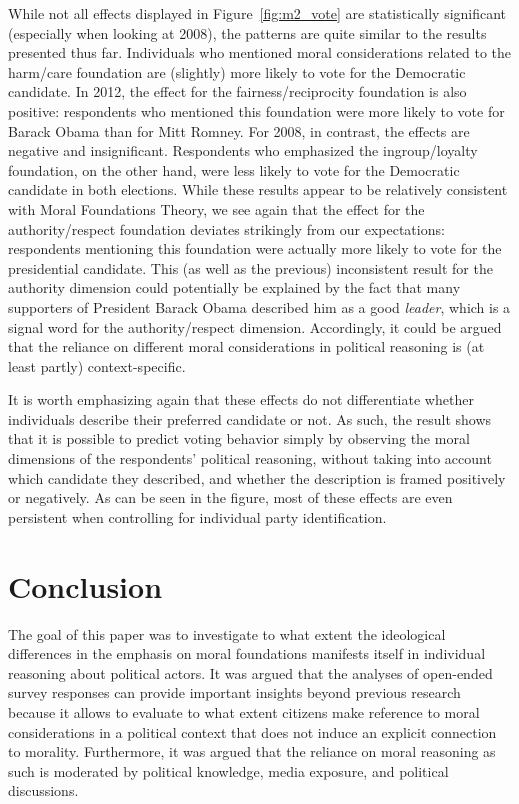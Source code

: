 \documentclass[12pt]{paper}
\begin{document}
While not all effects displayed in Figure~\ref{fig:m2_vote} are statistically significant (especially when looking at 2008), the patterns are quite similar to the results presented thus far. Individuals who mentioned moral considerations related to the harm/care foundation are (slightly) more likely to vote for the Democratic candidate. In 2012, the effect for the fairness/reciprocity foundation is also positive: respondents who mentioned this foundation were more likely to vote for Barack Obama than for Mitt Romney. For 2008, in contrast, the effects are negative and insignificant. Respondents who emphasized the ingroup/loyalty foundation, on the other hand, were less likely to vote for the Democratic candidate in both elections. While these results appear to be relatively consistent with Moral Foundations Theory, we see again that the effect for the authority/respect foundation deviates strikingly from our expectations: respondents mentioning this foundation were actually more likely to vote for the presidential candidate. This (as well as the previous) inconsistent result for the authority dimension could potentially be explained by the fact that many supporters of President Barack Obama described him as a good \textit{leader}, which is a signal word for the authority/respect dimension. Accordingly, it could be argued that the reliance on different moral considerations in political reasoning is (at least partly) context-specific.

It is worth emphasizing again that these effects do not differentiate whether individuals describe their preferred candidate or not. As such, the result shows that it is possible to predict voting behavior simply by observing the moral dimensions of the respondents' political reasoning, without taking into account which candidate they described, and whether the description is framed positively or negatively. As can be seen in the figure, most of these effects are even persistent when controlling for individual party identification.


\section{Conclusion}

The goal of this paper was to investigate to what extent the ideological differences in the emphasis on moral foundations manifests itself in individual reasoning about political actors. It was argued that the analyses of open-ended survey responses can provide important insights beyond previous research because it allows to evaluate to what extent citizens make reference to moral considerations in a political context that does not induce an explicit connection to morality. Furthermore, it was argued that the reliance on moral reasoning as such is moderated by political knowledge, media exposure, and political discussions.
\end{document}
